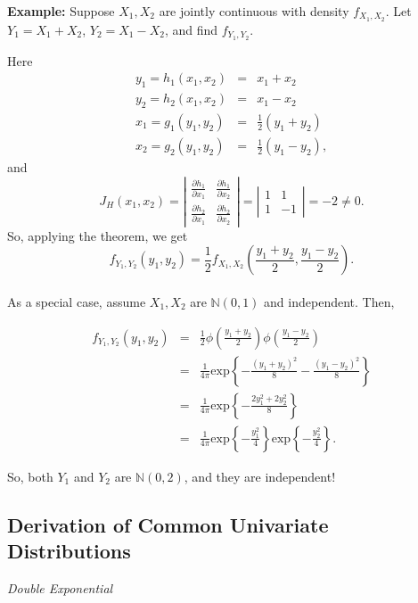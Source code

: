 \documentclass[12pt,oneside]{article}
\begin{document}
\noindent \textbf{Example:} Suppose $X_1,X_2$ are jointly continuous with density $f_{X_1,X_2}$.  Let $Y_1 = X_1+X_2$, $Y_2 = X_1-X_2$,  and find $f_{Y_1,Y_2}$.

Here \begin{eqnarray*} y_1 = h_1(x_1,x_2) &=& x_1+x_2 \\
			       y_2 = h_2(x_1,x_2) &=& x_1-x_2 \\
			       x_1 = g_1(y_1,y_2) &=& \frac{1}{2} (y_1+y_2) \\
			       x_2 = g_2(y_1,y_2) &=& \frac{1}{2} (y_1-y_2) , \end{eqnarray*}
and
\[J_H(x_1,x_2) = \left | \begin{array}{cc} \frac{\partial h_1}{\partial x_1} & \frac{\partial h_1}{\partial x_2} \\ \frac{\partial h_2}{\partial x_1} & \frac{\partial h_2}{\partial x_2} \end{array} \right |
		= \left | \begin{array}{cc} 1 & 1 \\ 1 & -1 \end{array} \right | = -2 \neq 0. \]
So, applying the theorem, we get
\[f_{Y_1,Y_2}(y_1,y_2) = \frac{1}{2} f_{X_1,X_2} (\frac{y_1+y_2}{2},\frac{y_1-y_2}{2}). \] \\

As a special case, assume $X_1,X_2$ are $\mathbb{N}(0,1)$ and independent.  Then,

\begin{eqnarray*} f_{Y_1,Y_2}(y_1,y_2) &=& \frac{1}{2} \phi(\frac{y_1+y_2}{2}) \phi(\frac{y_1-y_2}{2}) \\
					&=& \frac{1}{4 \pi} \mbox{exp} \left \{-\frac{(y_1+y_2)^2}{8} - \frac{(y_1-y_2)^2}{8} \right \} \\
					&=&  \frac{1}{4 \pi} \mbox{exp} \left \{-\frac{2y_1^2+2y_2^2}{8} \right \} \\
					&=&  \frac{1}{4 \pi} \mbox{exp} \left \{-\frac{y_1^2}{4} \right \} \mbox{exp} \left \{-\frac{y_2^2}{4} \right \}. \end{eqnarray*}

So, both $Y_1$ and $Y_2$ are $\mathbb{N}(0,2)$, and they are independent!

\subsection{Derivation of Common Univariate Distributions}

\noindent \emph{Double Exponential} \\
\end{document}
